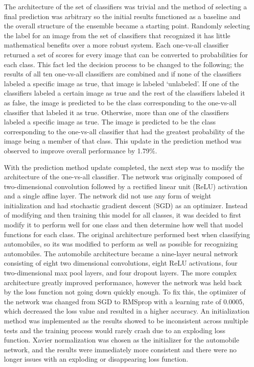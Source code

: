 \documentclass[10pt,twocolumn,letterpaper]{article}
\begin{document}
The architecture of the set of classifiers was trivial and the method of selecting a final prediction was arbitrary so the initial results functioned as a baseline and the overall structure of the ensemble became a starting point. Randomly selecting the label for an image from the set of classifiers that recognized it has little mathematical benefits over a more robust system. Each one-vs-all classifier returned a set of scores for every image that can be converted to probabilities for each class. This fact led the decision process to be changed to the following; the results of all ten one-vs-all classifiers are combined and if none of the classifiers labeled a specific image as true, that image is labeled ‘unlabeled’. If one of the classifiers labeled a certain image as true and the rest of the classifiers labeled it as false, the image is predicted to be the class corresponding to the one-vs-all classifier that labeled it as true. Otherwise, more than one of the classifiers labeled a specific image as true. The image is predicted to be the class corresponding to the one-vs-all classifier that had the  greatest probability of the image being a member of that class. This update in the prediction method was observed to improve overall performance by 1.79\%.

With the prediction method update completed, the next step was to modify the architecture of the one-vs-all classifier. The network was originally composed of two-dimensional convolution followed by a rectified linear unit (ReLU) activation and a single affine layer. The network did not use any form of weight initialization and had stochastic gradient descent (SGD) as an optimizer. Instead of modifying and then training this model for all classes, it was decided to first modify it to perform well for one class and then determine how well that model functions for each class. The original architecture performed best when classifying automobiles, so its was modified to perform as well as possible for recognizing automobiles. The automobile architecture became a nine-layer neural network consisting of eight two dimensional convolutions, eight ReLU activations, four two-dimensional max pool layers, and four dropout layers. The more complex architecture greatly improved performance, however the network was held back by the loss function not going down quickly enough. To fix this, the optimizer of the network was changed from SGD to RMSprop with a learning rate of 0.0005, which decreased the loss value and resulted in a higher accuracy. An initialization method was implemented  as the results showed to be inconsistent across multiple tests and the training process would rarely crash due to an exploding loss function. Xavier normalization was chosen as the initializer for the automobile network, and the results were immediately more consistent and there were no longer issues with an exploding or disappearing loss function.
\end{document}
